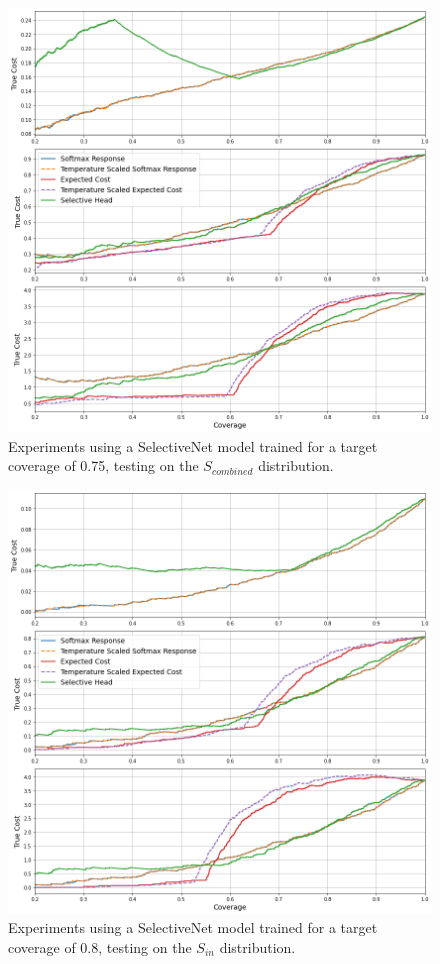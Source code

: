 \begin{figure}[H]
	\includegraphics[width=\textwidth]{images/binary/sn0.75_combine_distribution.png}
	\caption*{Experiments using a SelectiveNet model trained for a target coverage of 0.75, testing on the $S_{combined}$ distribution.}
\end{figure}

\begin{figure}[H]
	\includegraphics[width=\textwidth]{images/binary/sn0.8_in_distribution.png}
	\caption*{Experiments using a SelectiveNet model trained for a target coverage of 0.8, testing on the $S_{in}$ distribution.}
\end{figure}

